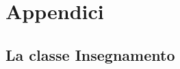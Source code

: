 \appendix
\chapter*{Appendici}
\renewcommand{\thesection}{\Alph{section}}
	\captionsetup{aboveskip=1pt, belowskip=30pt} %

	\section{La classe Insegnamento}\label{appendix:model}
		\inputminted[autogobble, frame=lines, framesep=3mm]{swift}{code/Insegnamento.swift}

